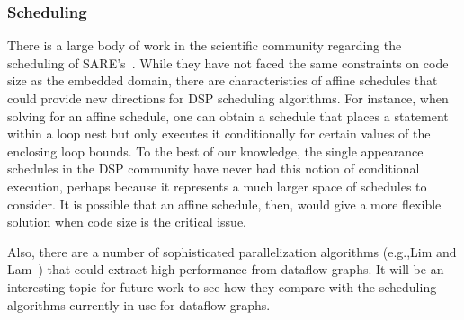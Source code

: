 \subsubsection{Scheduling}

There is a large body of work in the scientific community regarding
the scheduling of SARE's~\cite{DRV00}.  While they have not faced the
same constraints on code size as the embedded domain, there are
characteristics of affine schedules that could provide new directions
for DSP scheduling algorithms.  For instance, when solving for an
affine schedule, one can obtain a schedule that places a statement
within a loop nest but only executes it conditionally for certain
values of the enclosing loop bounds.  To the best of our knowledge,
the single appearance schedules in the DSP community have never had
this notion of conditional execution, perhaps because it represents a
much larger space of schedules to consider.  It is possible that an
affine schedule, then, would give a more flexible solution when code
size is the critical issue.

Also, there are a number of sophisticated parallelization algorithms
(e.g.,Lim and Lam~\cite{Lim01}) that could extract high performance
from dataflow graphs.  It will be an interesting topic for future work
to see how they compare with the scheduling algorithms currently in
use for dataflow graphs.







